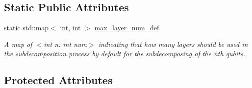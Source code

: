 \subsection*{Static Public Attributes}
\begin{DoxyCompactItemize}
\item 
static std\+::map$<$ int, int $>$ \hyperlink{class_decomposition___base_a17952d9e72bbc214eb3a1466270b853d}{max\+\_\+layer\+\_\+num\+\_\+def}
\begin{DoxyCompactList}\small\item\em A map of $<$int n\+: int num$>$ indicating that how many layers should be used in the subdecomposition process by default for the subdecomposing of the nth qubits. \end{DoxyCompactList}\end{DoxyCompactItemize}
\subsection*{Protected Attributes}
